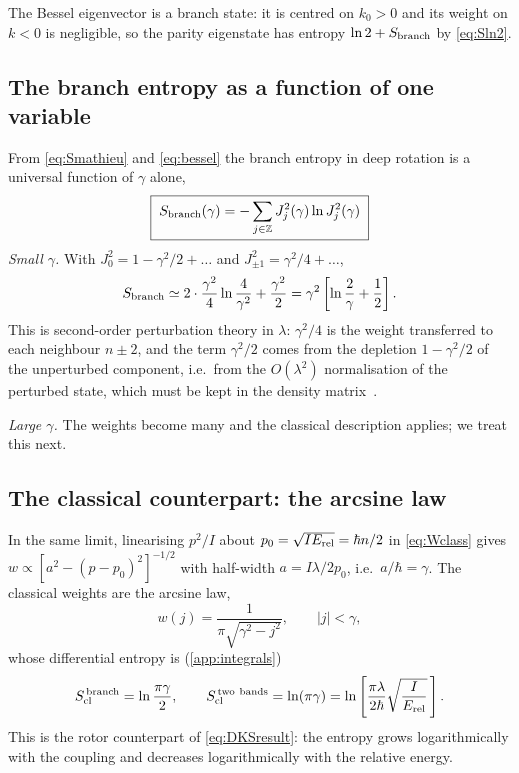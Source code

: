 \documentclass[preprint,12pt]{elsarticle}
\newcommand{\Erel}{E_{\rm rel}}
\newcommand{\Scl}{S_{\rm cl}}
\begin{document}
The Bessel eigenvector is a branch state: it is centred on $k_{0}>0$ and its
weight on $k<0$ is negligible, so the parity eigenstate has entropy
$\ln2+S_{\rm branch}$ by \eqref{eq:Sln2}.

\subsection{The branch entropy as a function of one variable}

From \eqref{eq:Smathieu} and \eqref{eq:bessel} the branch entropy in deep
rotation is a universal function of $\gamma$ alone,
\begin{equation}
\boxed{\;S_{\rm branch}(\gamma)=-\sum_{j\in\mathbb{Z}}J_{j}^{2}(\gamma)\ln
J_{j}^{2}(\gamma)\;}
\label{eq:SB}
\end{equation}
\emph{Small $\gamma$.} With $J_{0}^{2}=1-\gamma^{2}/2+\dots$ and
$J_{\pm1}^{2}=\gamma^{2}/4+\dots$,
\begin{equation}
S_{\rm branch}\simeq2\cdot\frac{\gamma^{2}}{4}\ln\frac{4}{\gamma^{2}}
+\frac{\gamma^{2}}{2}=\gamma^{2}\left[\ln\frac{2}{\gamma}+\frac12\right].
\label{eq:Ssmall}
\end{equation}
This is second-order perturbation theory in $\lambda$: $\gamma^{2}/4$ is the
weight transferred to each neighbour $n\pm2$, and the term $\gamma^{2}/2$ comes
from the depletion $1-\gamma^{2}/2$ of the unperturbed component, i.e.\ from the
$O(\lambda^{2})$ normalisation of the perturbed state, which must be kept in the
density matrix~\cite{companion}.

\emph{Large $\gamma$.} The weights become many and the classical description
applies; we treat this next.

\subsection{The classical counterpart: the arcsine law}

In the same limit, linearising $p^{2}/I$ about $p_{0}=\sqrt{I\Erel}=\hbar n/2$
in \eqref{eq:Wclass} gives
$w\propto[a^{2}-(p-p_{0})^{2}]^{-1/2}$ with half-width $a=I\lambda/2p_{0}$,
i.e.\ $a/\hbar=\gamma$. The classical weights are the arcsine law,
\begin{equation}
w(j)=\frac{1}{\pi\sqrt{\gamma^{2}-j^{2}}},\qquad |j|<\gamma,
\label{eq:arcsine}
\end{equation}
whose differential entropy is (\ref{app:integrals})
\begin{equation}
\Scl^{\,\rm branch}=\ln\frac{\pi\gamma}{2},\qquad
\Scl^{\,\rm two\ bands}=\ln(\pi\gamma)
=\ln\left[\frac{\pi\lambda}{2\hbar}\sqrt{\frac{I}{\Erel}}\,\right].
\label{eq:Sclrot}
\end{equation}
This is the rotor counterpart of \eqref{eq:DKSresult}: the entropy grows
logarithmically with the coupling and decreases logarithmically with the
relative energy.
\end{document}
